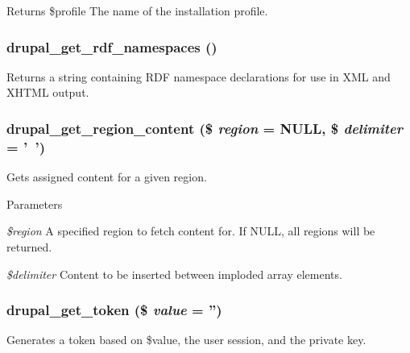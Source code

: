 \begin{DoxyReturn}{Returns}
\$profile The name of the installation profile. 
\end{DoxyReturn}
\hypertarget{common_8inc_aa9c5659618a108b2b031a4fd3438a420}{
\subsubsection[{drupal\_\-get\_\-rdf\_\-namespaces}]{\setlength{\rightskip}{0pt plus 5cm}drupal\_\-get\_\-rdf\_\-namespaces ()}}
\label{common_8inc_aa9c5659618a108b2b031a4fd3438a420}
Returns a string containing RDF namespace declarations for use in XML and XHTML output. \hypertarget{common_8inc_a3e5f6ebc1abb928bf1634b6813f46dca}{
\subsubsection[{drupal\_\-get\_\-region\_\-content}]{\setlength{\rightskip}{0pt plus 5cm}drupal\_\-get\_\-region\_\-content (\$ {\em region} = {\ttfamily NULL}, \/  \$ {\em delimiter} = {\ttfamily '~'})}}
\label{common_8inc_a3e5f6ebc1abb928bf1634b6813f46dca}
Gets assigned content for a given region.


\begin{DoxyParams}{Parameters}
\item[{\em \$region}]A specified region to fetch content for. If NULL, all regions will be returned. \item[{\em \$delimiter}]Content to be inserted between imploded array elements. \end{DoxyParams}
\hypertarget{common_8inc_a16989177d9fa05df9b45e8797ce04994}{
\subsubsection[{drupal\_\-get\_\-token}]{\setlength{\rightskip}{0pt plus 5cm}drupal\_\-get\_\-token (\$ {\em value} = {\ttfamily ''})}}
\label{common_8inc_a16989177d9fa05df9b45e8797ce04994}
Generates a token based on \$value, the user session, and the private key.


